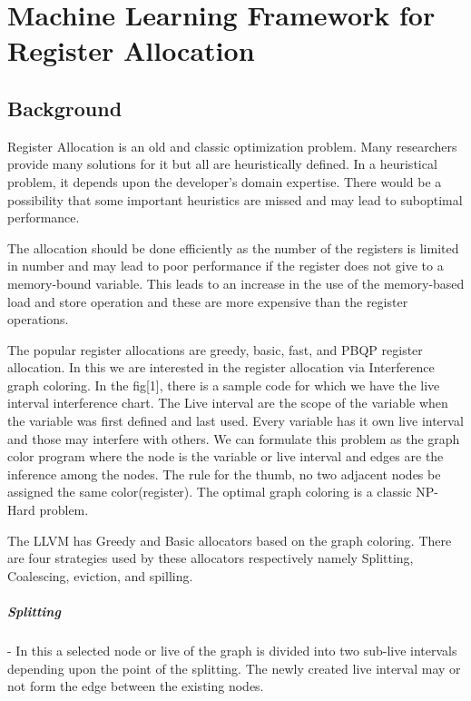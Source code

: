 \chapter{Machine Learning Framework for Register Allocation}
\label{chap:ch5}

\section{Background}
Register Allocation is an old and classic optimization problem. Many researchers provide many solutions for it but all are heuristically defined. In a heuristical problem, it depends upon the developer’s domain expertise. There would be a possibility that some important heuristics are missed and may lead to suboptimal performance.

The allocation should be done efficiently as the number of the registers is limited in number and may lead to poor performance if the register does not give to a memory-bound variable. This leads to an increase in the use of the memory-based load and store operation and these are more expensive than the register operations. 

The popular register allocations are greedy, basic, fast, and PBQP register allocation. In this we are interested in the register allocation via Interference graph coloring. In the fig[1], there is a sample code for which we have the live interval interference chart. The Live interval are the scope of the variable when the variable was first defined and last used. Every variable has it own live interval and those may interfere with others. We can formulate this problem as the graph color program where the node is the variable or live interval and edges are the inference among the nodes. The rule for the thumb, no two adjacent nodes be assigned the same color(register). The optimal graph coloring is a classic NP-Hard problem. 

The LLVM has Greedy and Basic allocators based on the graph coloring. There are four strategies used by these allocators respectively namely Splitting, Coalescing, eviction, and spilling. 

\paragraph{Splitting} - In this a selected node or live of the graph is divided into two sub-live intervals depending upon the point of the splitting. The newly created live interval may or not form the edge between the existing nodes.

